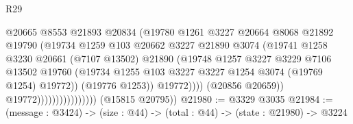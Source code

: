 \begin{lexlean}{R29}
\begin{coremodule}
                                            @20665
                                            @8553
                                            @21893
                                            @20834
                                            (@19780
                                              @1261
                                              @3227
                                              @20664
                                              @8068
                                              @21892
                                              @19790
                                              (@19734
                                                @1259
                                                @103
                                                @20662
                                                @3227
                                                @21890
                                                @3074
                                                (@19741
                                                  @1258
                                                  @3230
                                                  @20661
                                                  (@7107 @13502)
                                                  @21890
                                                  (@19748
                                                    @1257
                                                    @3227
                                                    @3229
                                                    @7106
                                                    @13502
                                                    @19760
                                                    (@19734
                                                      @1255
                                                      @103
                                                      @3227
                                                      @3227
                                                      @1254
                                                      @3074
                                                      (@19769 @1254)
                                                      @19772))
                                                  (@19776 @1253))
                                                @19772))))
                                        (@20856 @20659))
                                      @19772))))))))))))))))
      (@15815 @20795))
@21980 := @3329 @3035
@21984 := (message : @3424) -> (size : @44) -> (total : @44) -> (state : @21980) -> @3224

\end{coremodule}
\end{lexlean}
